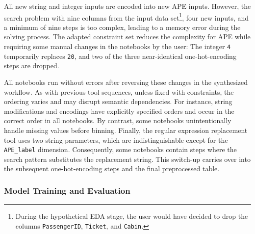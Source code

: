 All new string and integer inputs are encoded into new APE inputs. However, the search problem with nine columns from the input data set\footnote{During the hypothetical EDA stage, the user would have decided to drop the columns \texttt{PassengerID}, \texttt{Ticket}, and \texttt{Cabin}.}, four new inputs, and a minimum of nine steps is too complex, leading to a memory error during the solving process. The adapted constraint set reduces the complexity for APE while requiring some manual changes in the notebooks by the user: The integer \verb|4| temporarily replaces \verb|20|, and two of the three near-identical one-hot-encoding steps are dropped.

All notebooks run without errors after reversing these changes in the synthesized workflow. As with previous tool sequences, unless fixed with constraints, the ordering varies and may disrupt semantic dependencies. For instance, string modifications and encodings have explicitly specified orders and occur in the correct order in all notebooks. By contrast, some notebooks unintentionally handle missing values before binning. Finally, the regular expression replacement tool uses two string parameters, which are indistinguishable except for the \verb|APE_label| dimension. Consequently, some notebooks contain steps where the search pattern substitutes the replacement string. This switch-up carries over into the subsequent one-hot-encoding steps and the final preprocessed table.

\subsubsection{Model Training and Evaluation}

